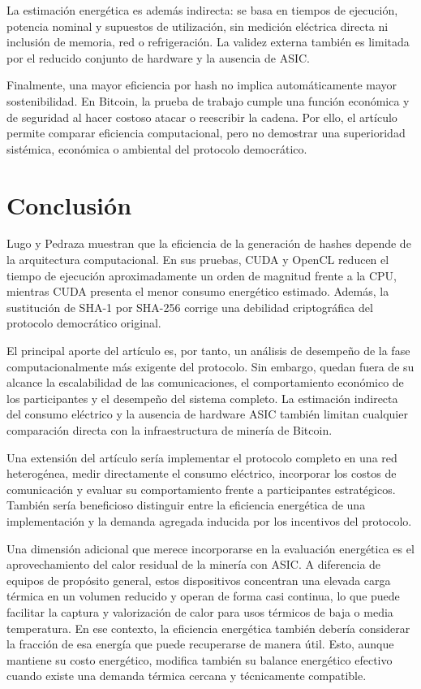 \documentclass[spanish,11pt]{article}
\begin{document}
La estimación energética es además indirecta: se basa en tiempos de ejecución, potencia nominal 
y supuestos de utilización, sin medición eléctrica directa ni inclusión de memoria, 
red o refrigeración. La validez externa también es limitada por el reducido conjunto 
de hardware y la ausencia de ASIC.

Finalmente, una mayor eficiencia por hash no implica automáticamente mayor 
sostenibilidad. En Bitcoin, la prueba de trabajo cumple una función económica y 
de seguridad al hacer costoso atacar o reescribir la cadena. Por ello, el artículo 
permite comparar eficiencia computacional, pero no demostrar una superioridad sistémica, 
económica o ambiental del protocolo democrático.

\section{Conclusión}\label{conclusion}

Lugo y Pedraza muestran que la eficiencia de la generación de hashes depende 
de la arquitectura computacional. En sus pruebas, CUDA y OpenCL reducen el tiempo de ejecución 
aproximadamente un orden de magnitud frente a la CPU, mientras CUDA presenta el menor consumo 
energético estimado. Además, la sustitución de SHA-1 por SHA-256 corrige una debilidad 
criptográfica del protocolo democrático original.

El principal aporte del artículo es, por tanto, un análisis de 
desempeño de la fase computacionalmente más exigente del protocolo. 
Sin embargo, quedan fuera de su alcance la escalabilidad de 
las comunicaciones, el comportamiento económico de los participantes y el 
desempeño del sistema completo. La estimación indirecta del consumo eléctrico 
y la ausencia de hardware ASIC también limitan cualquier comparación directa 
con la infraestructura de minería de Bitcoin.

Una extensión del artículo sería implementar el protocolo completo en una red heterogénea, 
medir directamente el consumo eléctrico, incorporar los costos de comunicación 
y evaluar su comportamiento frente a participantes estratégicos. También sería 
beneficioso distinguir entre la eficiencia energética de una implementación y 
la demanda agregada inducida por los incentivos del protocolo.

Una dimensión adicional que merece incorporarse en la evaluación energética 
es el aprovechamiento del calor residual de la minería con ASIC. 
A diferencia de equipos de propósito general, estos dispositivos 
concentran una elevada carga térmica en un volumen reducido y operan de 
forma casi continua, lo que puede facilitar la captura y valorización de 
calor para usos térmicos de baja o media temperatura. En ese contexto, la eficiencia 
energética también debería considerar la fracción de esa 
energía que puede recuperarse de manera útil. Esto, aunque mantiene su costo energético,
modifica también su balance energético efectivo cuando existe una demanda 
térmica cercana y técnicamente compatible.
\end{document}
